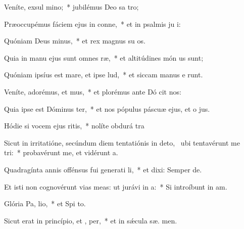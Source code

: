\item Veníte, exsul mino;~* jubilémus Deo sa tro;
\item Præoccupémus fáciem ejus in conne,~* et in psalmis ju i:
\item Quóniam Deus  minus,~* et rex magnus su  os.
\item Quia in manu ejus sunt omnes  ræ,~* et altitúdines món us sunt;
\item Quóniam ipsíus est mare, et ipse  lud,~* et siccam manus e runt.
\item Veníte, adorémus, et mus,~* et plorémus ante Dó  cit nos:
\item Quia ipse est Dóminus  ter,~* et nos pópulus páscuæ ejus, et o  jus.
\item Hódie si vocem ejus ritis,~* nolíte obdurá  tra
\item Sicut in irritatióne, secúndum diem tentatiónis in deto,~\pscross{} ubi tentavérunt me  tri:~* probavérunt me, et vidérunt  a.
\item Quadragínta annis offénsus fui generati li,~* et dixi: Semper   de.
\item Et isti non cognovérunt vias meas: ut jurávi in  a:~* Si introíbunt in  am.
\item Glória Pa,  lio,~* et Spi to.
\item Sicut erat in princípio, et ,  per,~* et in sǽcula sæ. men.
